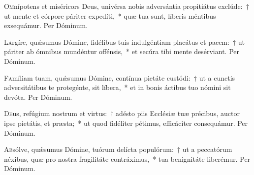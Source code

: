 \documentclass[vesperale_romanum.tex]{subfiles}
\begin{document}


\oratio

\lettrine{O}{m}nípotens et miséricors Deus, univérsa nobis adversántia propitiátus exclúde:~† ut mente et córpore páriter expedíti,~* quæ tua sunt, líberis méntibus exsequámur. Per Dóminum.



\oratio

\lettrine{L}{a}rgíre, quǽsumus Dómine, fidélibus tuis indulgéntiam placátus et pacem:~† ut páriter ab ómnibus mundéntur offénsis,~* et secúra tibi mente desérviant. Per Dóminum.



\oratio

\lettrine{F}{a}míliam tuam, quǽsumus Dómine, contínua pietáte custódi:~† ut a cun\-ctis adversitátibus te protegénte, sit líbera,~* et in bonis áctibus tuo nómini sit devóta. Per Dóminum.



\oratio

\lettrine{D}{e}us, refúgium nostrum et virtus:~† adésto piis Ecclésiæ tuæ précibus, auctor ipse pietátis, et præsta;~* ut quod fidéliter pétimus, efficáciter consequámur. Per Dóminum.




\oratio

\lettrine{A}{b}sólve, quǽsumus Dómine, tuórum delícta populórum:~† ut a peccatórum néxibus, quæ pro nostra fragilitáte contráximus,~* tua benignitáte liberémur. Per Dóminum.
\end{document}

